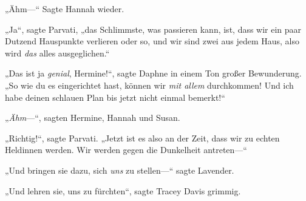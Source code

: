 „Ähm—“ Sagte Hannah wieder.

„Ja“, sagte Parvati, „das Schlimmste, was passieren kann, ist, dass wir ein paar Dutzend Hauspunkte verlieren oder so, und wir sind zwei aus jedem Haus, also wird \emph{das} alles ausgeglichen.“

„Das ist ja \emph{genial}, Hermine!“, sagte Daphne in einem Ton großer Bewunderung.
„So wie du es eingerichtet hast, können wir \emph{mit allem} durchkommen! Und ich habe deinen schlauen Plan bis jetzt nicht einmal bemerkt!“

„\emph{Ähm}—“, sagten Hermine, Hannah und Susan.

„Richtig!“, sagte Parvati.
„Jetzt ist es also an der Zeit, dass wir zu echten Heldinnen werden. Wir werden gegen die Dunkelheit antreten—“

„Und bringen sie dazu, sich \emph{uns} zu stellen—“ sagte Lavender.

„Und lehren sie, uns zu fürchten“, sagte Tracey Davis grimmig.

